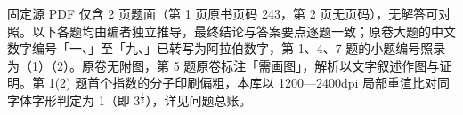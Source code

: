 

\begin{gktip}
固定源 PDF 仅含 2 页题面（第 1 页原书页码 243，第 2 页无页码），无解答可对照。以下各题均由编者独立推导，最终结论与答案要点逐题一致；原卷大题的中文数字编号「一、」至「九、」已转写为阿拉伯数字，第 1、4、7 题的小题编号照录为（1）（2）。原卷无附图，第 5 题原卷标注「需画图」，解析以文字叙述作图与证明。第 1(2) 题首个指数的分子印刷偏粗，本库以 1200—2400dpi 局部重渲比对同字体字形判定为 1（即 $3^{\frac{1}{2}}$），详见问题总账。
\end{gktip}

